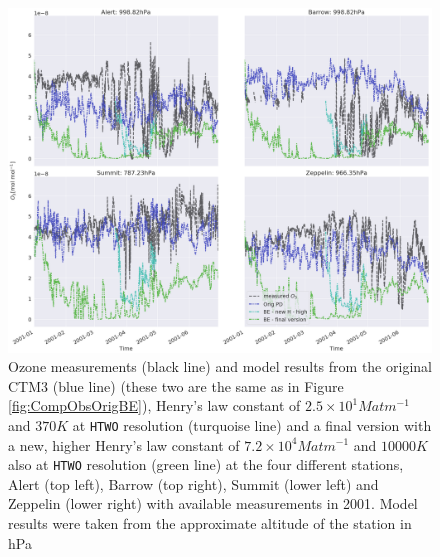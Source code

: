\begin{figure}[ht]
    \centering
    \includegraphics[width=\linewidth]{Chapter6_Results/images/ozone_stationComp_2001/ozone_2001_step4.png}
    \caption{Ozone measurements (black line) and model results from the original CTM3 (blue line) (these two are the same as in Figure \ref{fig:CompObsOrigBE}), Henry's law constant of $2.5\times10^{1} M atm ^{-1}$ and $370 K$ at \texttt{HTWO} resolution (turquoise line) and a final version with a new, higher Henry's law constant of $7.2\times10^{4} M atm ^{-1}$ and $10 000 K$ also at \texttt{HTWO} resolution (green line) at the four different stations, Alert (top left), Barrow (top right), Summit (lower left) and Zeppelin (lower right) with available measurements in 2001. Model results were taken from the approximate altitude of the station in hPa}
    \label{fig:ozone_2001_step4}
\end{figure}